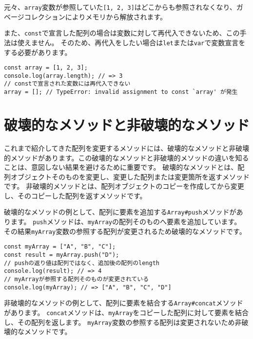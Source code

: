 元々、\texttt{array}変数が参照していた\texttt{[1, 2, 3]}はどこからも参照されなくなり、ガベージコレクションによりメモリから解放されます。

また、\texttt{const}で宣言した配列の場合は変数に対して再代入できないため、この手法は使えません。
そのため、再代入をしたい場合は\texttt{let}または\texttt{var}で変数宣言をする必要があります。

\begin{lstlisting}
const array = [1, 2, 3];
console.log(array.length); // => 3
// constで宣言された変数には再代入できない
array = []; // TypeError: invalid assignment to const `array' が発生
\end{lstlisting}

\hypertarget{mutable-immutable}{%
\section{破壊的なメソッドと非破壊的なメソッド}\label{mutable-immutable}}

これまで紹介してきた配列を変更するメソッドには、破壊的なメソッドと非破壊的メソッドがあります。この破壊的なメソッドと非破壊的メソッドの違いを知ることは、意図しない結果を避けるために重要です。
破壊的なメソッドとは、配列オブジェクトそのものを変更し、変更した配列または変更箇所を返すメソッドです。
非破壊的メソッドとは、配列オブジェクトのコピーを作成してから変更し、そのコピーした配列を返すメソッドです。

破壊的なメソッドの例として、配列に要素を追加する\texttt{Array\#push}メソッドがあります。
\texttt{push}メソッドは、\texttt{myArray}の配列そのものへ要素を追加しています。
その結果\texttt{myArray}変数の参照する配列が変更されるため破壊的なメソッドです。

\begin{lstlisting}
const myArray = ["A", "B", "C"];
const result = myArray.push("D"); 
// pushの返り値は配列ではなく、追加後の配列のlength
console.log(result); // => 4
// myArrayが参照する配列そのものが変更されている
console.log(myArray); // => ["A", "B", "C", "D"]
\end{lstlisting}

非破壊的なメソッドの例として、配列に要素を結合する\texttt{Array\#concat}メソッドがあります。
\texttt{concat}メソッドは、\texttt{myArray}をコピーした配列に対して要素を結合し、その配列を返します。
\texttt{myArray}変数の参照する配列は変更されないため非破壊的なメソッドです。

